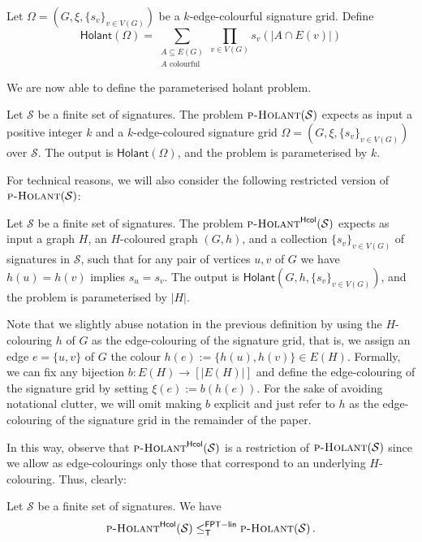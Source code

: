 \documentclass[authorcolumns,numberwithinsect]{no-lipics-v2022}
\newcommand{\fptlinred}{\leq^{\mathsf{FPT-lin}}_{\mathsf{T}}}
\newcommand{\holantprob}{\text{\sc{p-Holant}}}
\newcommand{\holantprobstar}{\text{\sc{p-Holant}}^{\mathsf{Hcol}}}
\newcommand{\holant}{\mathsf{Holant}}
\begin{document}
\begin{definition}
    Let $\Omega=(G,\xi,\{s_v\}_{v\in V(G)})$ be a $k$-edge-colourful signature grid. Define
    \[ \holant(\Omega) = \sum_{\substack{A \subseteq E(G)\\ A \text{ colourful}}} \prod_{v\in V(G)} s_v(|A \cap E(v)|) \]
\end{definition}

We are now able to define the parameterised holant problem.

\begin{definition}
    Let $\mathcal{S}$ be a finite set of signatures. The problem $\textsc{p-Holant}(\mathcal{S})$ expects as input a positive integer $k$ and a $k$-edge-coloured signature grid $\Omega=(G,\xi,\{s_v\}_{v\in V(G)})$ over $\mathcal{S}$. The output is $\holant(\Omega)$, and the problem is parameterised by $k$. 
\end{definition}

For technical reasons, we will also consider the following restricted version of $\textsc{p-Holant}(\mathcal{S})$:
\begin{definition}[$\holantprobstar(\mathcal{S})$]
    Let $\mathcal{S}$ be a finite set of signatures. The problem $\holantprobstar(\mathcal{S})$ expects as input a graph $H$, an $H$-coloured graph $(G,h)$, and a collection $\{s_v\}_{v\in V(G)}$ of signatures in $\mathcal{S}$, such that for any pair of vertices $u,v$ of $G$ we have $h(u)=h(v)$ implies $s_u=s_v$. The output is $\holant(G,h,\{s_v\}_{v\in V(G)})$, and the problem is parameterised by $|H|$.
\end{definition}

Note that we slightly abuse notation in the previous definition by using the $H$-colouring $h$ of $G$ as the edge-colouring of the signature grid, that is, we assign an edge $e=\{u,v\}$ of $G$ the colour $h(e):=\{h(u),h(v)\} \in E(H)$. Formally, we can fix any bijection $b:E(H) \to [|E(H)|]$ and define the edge-colouring of the signature grid by setting $\xi(e):=b(h(e))$. For the sake of avoiding notational clutter, we will omit making $b$ explicit and just refer to $h$ as the edge-colouring of the signature grid in the remainder of the paper. 

In this way, observe that $\holantprobstar(\mathcal{S})$ is a restriction of $\holantprob(\mathcal{S})$ since we allow as edge-colourings only those that correspond to an underlying $H$-colouring. Thus, clearly:

\begin{fact}\label{fact:easy_direction_equivalence}
    Let $\mathcal{S}$ be a finite set of signatures. We have
    \[ \holantprobstar(\mathcal{S}) \fptlinred \holantprob(\mathcal{S}) \,.\]
\end{fact}
\end{document}
